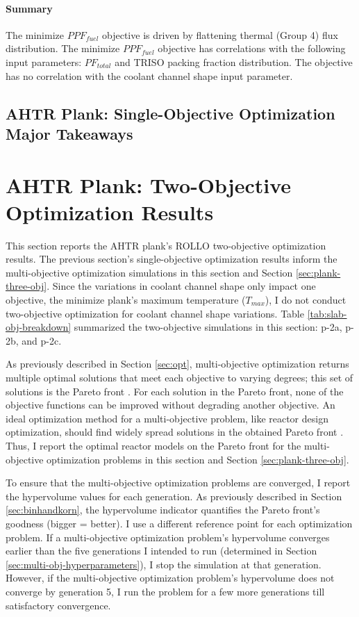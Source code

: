 \paragraph{Summary}
The minimize $PPF_{fuel}$ objective is driven by flattening thermal (Group 4) flux 
distribution. 
The minimize $PPF_{fuel}$ objective has correlations with the following input parameters: 
$PF_{total}$ and TRISO packing fraction distribution. 
The objective has no correlation with the coolant channel shape input parameter.

\subsection{AHTR Plank: Single-Objective Optimization Major Takeaways}


\section{AHTR Plank: Two-Objective Optimization Results}
\label{sec:plank-two-obj}
This section reports the \gls{AHTR} plank's \gls{ROLLO} two-objective 
optimization results. 
The previous section's single-objective optimization results inform the multi-objective 
optimization simulations in this section and Section \ref{sec:plank-three-obj}.
Since the variations in coolant channel shape only impact one objective, 
the minimize plank's maximum temperature ($T_{max}$), I do not conduct two-objective 
optimization for coolant channel shape variations.  
Table \ref{tab:slab-obj-breakdown} summarized the two-objective simulations in this 
section: p-2a, p-2b, and p-2c.

As previously described in Section \ref{sec:opt}, multi-objective optimization returns 
multiple optimal solutions that meet each objective to varying degrees; this set of 
solutions is the Pareto front \cite{deb_multi-objective_2001}. 
For each solution in the Pareto front, none of the objective functions can be 
improved without degrading another objective.
An ideal optimization method for a multi-objective problem, like reactor design 
optimization, should find widely spread solutions in the obtained Pareto front 
\cite{deb_multi-objective_2001}. 
Thus, I report the optimal reactor models on the Pareto front for the multi-objective 
optimization problems in this section and Section \ref{sec:plank-three-obj}. 

To ensure that the multi-objective optimization problems are converged, I report the 
hypervolume values for each generation. 
As previously described in Section \ref{sec:binhandkorn}, the hypervolume indicator 
quantifies the Pareto front's goodness (bigger = better).
I use a different reference point for each optimization problem. 
If a multi-objective optimization problem's hypervolume converges earlier than the 
five generations I intended to run (determined in Section 
\ref{sec:multi-obj-hyperparameters}), I stop the simulation at that generation. 
However, if the multi-objective optimization problem's hypervolume does not converge by 
generation 5, I run the problem for a few more generations till satisfactory convergence.

